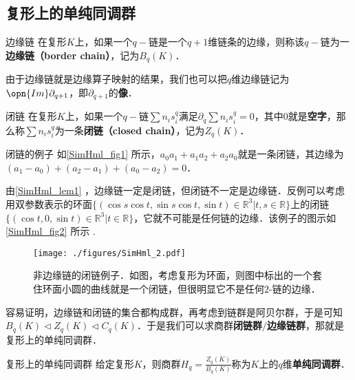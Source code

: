 \subsection{复形上的单纯同调群}


\begin{definition}{边缘链}
在复形$K$上，如果一个$q-$链是一个$q+1$维链条的边缘，则称该$q-$链为一\textbf{边缘链（border chain）}，记为$B_q(K)$．
\end{definition}

由于边缘链就是边缘算子映射的结果，我们也可以把$q$维边缘链记为$\opn{Im}\partial_{q+1}$，即$\partial_{q+1}$的\textbf{像}．

\begin{definition}{闭链}
在复形$K$上，如果一个$q-$链$\sum n_is^q_i$满足$\partial_q\sum n_is^q_i=0$，其中$0$就是\textbf{空字}，那么称$\sum n_is^q_i$为一条\textbf{闭链（closed chain）}，记为$Z_q(K)$．
\end{definition}

\begin{example}{闭链的例子}
如\autoref{SimHml_fig1} 所示，$a_0a_1+a_1a_2+a_2a_0$就是一条闭链，其边缘为$(a_1-a_0)+(a_2-a_1)+(a_0-a_2)=0$．
\end{example}

由\autoref{SimHml_lem1} ，边缘链一定是闭链，但闭链不一定是边缘链．反例可以考虑用双参数表示的环面$\{(\cos s\cos t, \sin s\cos t, \sin t)\in\mathbb{R}^3|t, s\in\mathbb{R}\}$上的闭链$\{(\cos t, 0, \sin t)\in\mathbb{R}^3|t\in\mathbb{R}\}$，它就不可能是任何链的边缘．该例子的图示如\autoref{SimHml_fig2} 所示 .


\begin{figure}[ht]
\centering
\texttt{[image: ./figures/SimHml\_2.pdf]}
\caption{非边缘链的闭链例子．如图，考虑复形为环面，则图中标出的一个套住环面小圆的曲线就是一个闭链，但很明显它不是任何$2$-链的边缘．} \label{SimHml_fig2}
\end{figure}




容易证明，边缘链和闭链的集合都构成群，再考虑到链群是阿贝尔群，于是可知$B_q(K)\triangleleft Z_q(K)\triangleleft C_q(K)$．于是我们可以求商群\textbf{闭链群}$/$\textbf{边缘链群}，那就是复形上的单纯同调群．


\begin{definition}{复形上的单纯同调群}
给定复形$K$，则商群$H_q=\frac{Z_q(K)}{B_q(K)}$称为$K$上的$q$维\textbf{单纯同调群}．
\end{definition}




